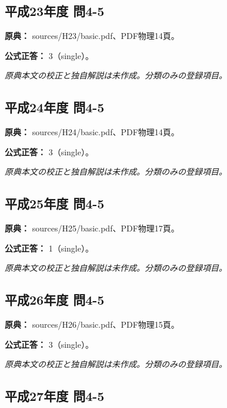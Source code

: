\subsection{平成23年度 問4-5}
\label{q:h23-reg-basic-4-5}

\noindent\textbf{原典：} sources/H23/basic.pdf、PDF物理14頁。

\textbf{公式正答：} 3（single）。

\par\textit{原典本文の校正と独自解説は未作成。分類のみの登録項目。}

\subsection{平成24年度 問4-5}
\label{q:h24-reg-basic-4-5}

\noindent\textbf{原典：} sources/H24/basic.pdf、PDF物理14頁。

\textbf{公式正答：} 3（single）。

\par\textit{原典本文の校正と独自解説は未作成。分類のみの登録項目。}

\subsection{平成25年度 問4-5}
\label{q:h25-reg-basic-4-5}

\noindent\textbf{原典：} sources/H25/basic.pdf、PDF物理17頁。

\textbf{公式正答：} 1（single）。

\par\textit{原典本文の校正と独自解説は未作成。分類のみの登録項目。}

\subsection{平成26年度 問4-5}
\label{q:h26-reg-basic-4-5}

\noindent\textbf{原典：} sources/H26/basic.pdf、PDF物理15頁。

\textbf{公式正答：} 3（single）。

\par\textit{原典本文の校正と独自解説は未作成。分類のみの登録項目。}

\subsection{平成27年度 問4-5}
\label{q:h27-reg-basic-4-5}

